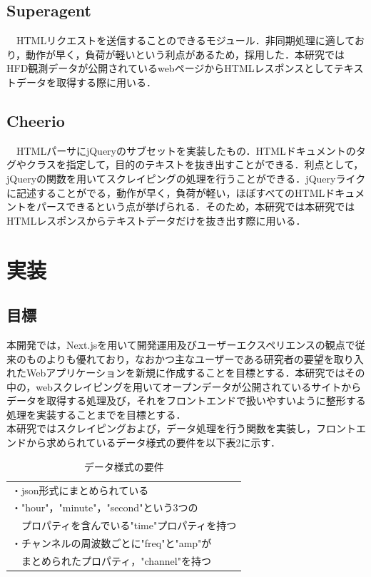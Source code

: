 \subsection{Superagent}

　HTMLリクエストを送信することのできるモジュール．非同期処理に適しており，動作が早く，負荷が軽いという利点があるため，採用した．本研究ではHFD観測データが公開されているwebページからHTMLレスポンスとしてテキストデータを取得する際に用いる．\cite{superagent}
\subsection{Cheerio}

　HTMLパーサにjQueryのサブセットを実装したもの．HTMLドキュメントのタグやクラスを指定して，目的のテキストを抜き出すことができる．利点として，jQueryの関数を用いてスクレイピングの処理を行うことができる．jQueryライクに記述することがでる，動作が早く，負荷が軽い，ほぼすべてのHTMLドキュメントをパースできるという点が挙げられる．そのため，本研究では本研究ではHTMLレスポンスからテキストデータだけを抜き出す際に用いる．\cite{cheerio}
\section{実装}
\subsection{目標}
 本開発では，Next.jsを用いて開発運用及びユーザーエクスペリエンスの観点で従来のものよりも優れており，なおかつ主なユーザーである研究者の要望を取り入れたWebアプリケーションを新規に作成することを目標とする．本研究ではその中の，webスクレイピングを用いてオープンデータが公開されているサイトからデータを取得する処理及び，それをフロントエンドで扱いやすいように整形する処理を実装することまでを目標とする．\\
 本研究ではスクレイピングおよび，データ処理を行う関数を実装し，フロントエンドから求められているデータ様式の要件を以下表2に示す． \\
 \begin{table}[h]
  \centering
  \caption{データ様式の要件}
  \begin{tabular}{l}
  \toprule
     ・json形式にまとめられている\\
     ・"hour"，"minute"，"second"という3つの\\
     　プロパティを含んでいる"time"プロパティを持つ\\
     ・チャンネルの周波数ごとに"freq"と"amp"が\\
     　まとめられたプロパティ，"channel"を持つ\\
  \end{tabular}
\end{table}

